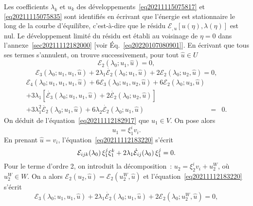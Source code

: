 \documentclass[12pt, final]{amsart}
\begin{document}
Les coefficients $\lambda_k$ et $u_k$ des
développements~\eqref{eq20211115075817} et \eqref{eq20211115075835} sont
identifiés en écrivant que l'énergie est stationnaire le long de
la courbe d'équilibre, c'est-{\`a}-dire que le résidu $\mathcal{E}_{,
u}  [u (\eta), \lambda (\eta)]$ est nul. Le développement limité du
résidu est établi au voisinage de $\eta = 0$ dans
l'annexe~\ref{sec20211112182000} [voir Éq.~\eqref{eq20220107080901}]. En
écrivant que tous ses termes s'annulent, on trouve successivement, pour
tout $\hat{u} \in U$
\begin{equation}
  \label{eq20211112182917} \mathcal{E}_2 (\lambda_0 ; u_1, \hat{u}) = 0,
\end{equation}
\begin{equation}
  \label{eq20211112183220} \mathcal{E}_3 (\lambda_0 ; u_1, u_1, \hat{u}) + 2
  \lambda_1  \dot{\mathcal{E}_2} (\lambda_0 ; u_1, \hat{u}) + 2\mathcal{E}_2
  (\lambda_0 ; u_2, \hat{u}) = 0,
\end{equation}
\begin{eqnarray}
  \mathcal{E}_4 (\lambda_0 ; u_1, u_1, u_1, \hat{u}) + 6\mathcal{E}_3
  (\lambda_0 ; u_1, u_2, \hat{u}) + 6\mathcal{E}_2 (\lambda_0 ; u_3, \hat{u})
  &  &  \nonumber\\
  + 3 \lambda_1  [\dot{\mathcal{E}_3} (\lambda_0 ; u_1, u_1, \hat{u}) + 2
  \dot{\mathcal{E}_2} (\lambda_0 ; u_2, \hat{u})] &  &  \nonumber\\
  + 3 \lambda_1^2  \ddot{\mathcal{E}_2} (\lambda_0 ; u_1, \hat{u}) + 6
  \lambda_2  \dot{\mathcal{E}_2} (\lambda_0 ; u_1, \hat{u}) & = & 0.
  \label{eq20220114135717}
\end{eqnarray}
On déduit de l'équation~\eqref{eq20211112182917} que $u_1 \in V$. On
pose alors
\begin{equation}
  \label{eq20220124135236} u_1 = \xi_1^i v_i .
\end{equation}
En prenant $\hat{u} = v_i$, l'équation~\eqref{eq20211112183220}
s'écrit
\begin{equation}
  \label{eq20220216140121} \mathcal{E}_{i  j  k} (\lambda_0)
  \hspace{0.17em} \xi_1^j \xi_1^k + 2 \lambda_1  \dot{\mathcal{E}}_{i
  j} (\lambda_0)  \hspace{0.17em} \xi_1^j = 0.
\end{equation}
Pour le terme d'ordre 2, on introduit la décomposition~: $u_2 = \xi_2^i
v_i + u_2^W$, o{\`u} $u_2^W \in W$. On a alors $\mathcal{E}_2 (u_2, \hat{u})
=\mathcal{E}_2 (u_2^W, \hat{u})$ et l'équation~\eqref{eq20211112183220}
s'écrit
\begin{equation}
  \mathcal{E}_3 (\lambda_0 ; u_1, u_1, \hat{u}) + 2 \lambda_1
  \dot{\mathcal{E}_2} (\lambda_0 ; u_1, \hat{u}) + 2\mathcal{E}_2 (\lambda_0 ;
  u_2^W, \hat{u}) = 0,
\end{equation}
\end{document}
